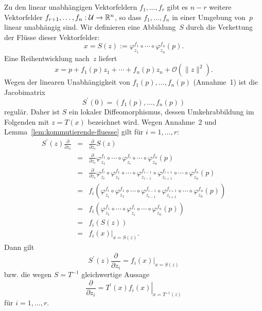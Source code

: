 \begin{svmultproof2}
Zu den linear unabhängigen Vektorfeldern $f_{1},\ldots,f_{r}$ gibt
es $n-r$ weitere Vektor\-felder $f_{r+1},\ldots,f_{n}:\mathcal{U}\to{\mathbb{R}}^{n}$,
so dass $f_{1},\ldots,f_{n}$ in einer Umgebung von~$p$ linear unabhängig
sind. Wir definieren eine Abbildung~$S$ durch die Verkettung der
Flüsse dieser Vektorfelder:
\begin{equation}
x=S(z):=\varphi_{z_{1}}^{f_{1}}\circ\cdots\circ\varphi_{z_{n}}^{f_{n}}(p).\label{eq:S-flussverknuepfung}
\end{equation}
Eine Reihentwicklung nach~$z$ liefert 
\[
x=p+f_{1}(p)z_{1}+\cdots+f_{n}(p)z_{n}+\mathcal{O}(\|z\|^{2}).
\]
Wegen der linearen Unabhängigkeit von $f_{1}(p),\ldots,f_{n}(p)$
(Annahme~1) ist die Jacobimatrix 
\[
S^{\prime}(0)=\left(f_{1}(p),\ldots,f_{n}(p)\right)
\]
regulär. Daher ist $S$ ein lokaler Diffeomorphismus, dessen Umkehrabbildung
im Folgenden mit $z=T(x)$ bezeichnet wird. Wegen Annahme~2 und Lemma~\ref{lem:kommutierende-fluesse}
gilt für $i=1,\ldots,r$:
\[
\begin{array}{ccl}
S^{\prime}(z)\frac{\partial}{\partial z_{i}} & = & \frac{\partial}{\partial z_{i}}S(z)\\
 & = & \frac{\partial}{\partial z_{i}}\varphi_{z_{1}}^{f_{1}}\circ\cdots\circ\varphi_{z_{i}}^{f_{i}}\circ\cdots\circ\varphi_{z_{n}}^{f_{n}}(p)\\
 & = & \frac{\partial}{\partial z_{i}}\varphi_{z_{i}}^{f_{i}}\circ\varphi_{z_{1}}^{f_{1}}\circ\cdots\circ\varphi_{z_{i-1}}^{f_{i-1}}\circ\varphi_{z_{i+1}}^{f_{i+1}}\circ\cdots\circ\varphi_{z_{n}}^{f_{n}}(p)\\
 & = & f_{i}\left(\varphi_{z_{i}}^{f_{i}}\circ\varphi_{z_{1}}^{f_{1}}\circ\cdots\circ\varphi_{z_{i-1}}^{f_{i-1}}\circ\varphi_{z_{i+1}}^{f_{i+1}}\circ\cdots\circ\varphi_{z_{n}}^{f_{n}}(p)\right)\\
 & = & f_{i}\left(\varphi_{z_{1}}^{f_{1}}\circ\cdots\circ\varphi_{z_{i}}^{f_{i}}\circ\cdots\circ\varphi_{z_{n}}^{f_{n}}(p)\right)\\
 & = & f_{i}(S(z))\\
 & = & \left.f_{i}(x)\right|_{x=S(z)}.
\end{array}
\]
Dann gilt 
\[
S^{\prime}(z)\frac{\partial}{\partial z_{i}}=\left.f_{i}(x)\right|_{x=S(z)}
\]
bzw. die wegen $S=T^{-1}$ gleichwertige Aussage 
\[
\frac{\partial}{\partial z_{i}}=\left.T^{\prime}(x)f_{i}(x)\right|_{x=T^{-1}(z)}
\]
für $i=1,\ldots,r$.
\end{svmultproof2}

